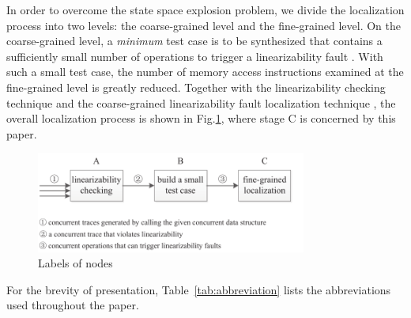 \documentclass[runningheads]{llncs}
\begin{document}
In order to overcome the state space explosion problem, we divide the localization process into two levels: the coarse-grained level and the fine-grained level.  On the coarse-grained level, a \textit{minimum} test case is to be synthesized that contains a sufficiently small number of operations to trigger a linearizability fault  \cite{DBLP:conf/seke/ZhangWZ17}. 
With such a small test case, the number of memory access instructions examined at the fine-grained level is greatly reduced.
Together with the linearizability checking technique \cite{DBLP:journals/concurrency/Lowe17} and the coarse-grained linearizability fault localization technique \cite{DBLP:conf/seke/ZhangWZ17}, the overall localization process is shown in Fig.\ref{fig:liucheng}, where stage C is concerned by this paper.
\begin{figure}[ht]
\centering
\includegraphics[width = 3.5in]{liucheng.pdf}
\caption{Labels of nodes}\label{fig:liucheng}
\end{figure}

For the brevity of presentation, Table~\ref{tab:abbreviation} lists the abbreviations used throughout the paper.
\begin{table}[]
\centering
\caption{Abbreviations}
\label{tab:abbreviation}
\end{table}
\end{document}
